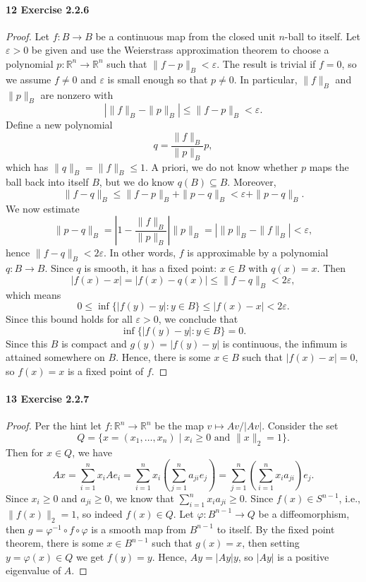 \documentclass[12pt]{article}
\newlength{\myparskip}
\newenvironment{fullbox}{\begin{lrbox}{\savefullbox}\begin{minipage}{\dimexpr\textwidth-2\fboxsep\relax}\setlength{\parskip}{\myparskip}}{\end{minipage}\end{lrbox}\framebox[\textwidth]{\usebox{\savefullbox}}}
\newenvironment{pbox}[1][]{\begin{fullbox}\def\temp{#1}\ifx\temp\empty\else\paragraph{#1}\phantom{}\fi}{\end{fullbox}}
\theoremstyle{definition}
\newcommand{\R}{\mathbb{R}}
\newcommand{\eps}{\varepsilon}
\renewcommand{\phi}{\varphi}
\newcommand{\<}{\langle}
\renewcommand{\>}{\rangle}
\newcommand{\seq}{\subseteq}
\begin{document}
\begin{pbox}[12 Exercise 2.2.6]
\end{pbox}

\begin{proof}
    Let $f : B \to B$ be a continuous map from the closed unit $n$-ball to itself.
    Let $\eps > 0$ be given and use the Weierstrass approximation theorem to choose a polynomial $p : \R^n \to \R^n$ such that $\|f - p\|_{B} < \eps$.
    The result is trivial if $f = 0$, so we assume $f \ne 0$ and $\eps$ is small enough so that $p \ne 0$.
    In particular, $\|f\|_B$ and $\|p\|_B$ are nonzero with
    \[
        |\|f\|_{B} - \|p\|_{B}| \leq \|f - p\|_{B} < \eps.
    \]
    Define a new polynomial
    \[
        q = \frac{\|f\|_{B}}{\|p\|_{B}}p,
    \]
    which has $\|q\|_B = \|f\|_B \leq 1$.
    A priori, we do not know whether $p$ maps the ball back into itself $B$, but we do know $q(B) \seq B$.
    Moreover,
    \[
        \|f - q\|_B
            \leq \|f - p\|_B + \|p - q\|_B
            < \eps + \|p - q\|_B.
    \]
    We now estimate
    \[
        \|p - q\|_B
            = \left|1 - \frac{\|f\|_B}{\|p\|_B}\right|\|p\|_B
            = |\|p\|_B - \|f\|_B|
            < \eps,
    \]
    hence $\|f - q\|_B < 2\eps$.
    In other words, $f$ is approximable by a polynomial $q : B \to B$.
    Since $q$ is smooth, it has a fixed point: $x \in B$ with $q(x) = x$.
    Then
    \[
        |f(x) - x|
            = |f(x) - q(x)|
            \leq \|f - q\|_B
            < 2\eps,
    \]
    which means
    \[
        0 \leq \inf\{|f(y) - y| : y \in B\} \leq |f(x) - x| < 2\eps.
    \]
    Since this bound holds for all $\eps > 0$, we conclude that
    \[
        \inf\{|f(y) - y| : y \in B\} = 0.
    \]
    Since this $B$ is compact and $g(y) = |f(y) - y|$ is continuous, the infimum is attained somewhere on $B$.
    Hence, there is some $x \in B$ such that $|f(x) - x| = 0$, so $f(x) = x$ is a fixed point of $f$.
\end{proof}


\newpage
\begin{pbox}[13 Exercise 2.2.7]
\end{pbox}

\begin{proof}
    Per the hint let $f : \R^n \to \R^n$ be the map $v \mapsto Av/|Av|$.
    Consider the set
    \[\textstyle
        Q = \{x = (x_1, \dots, x_n) \mid x_i \geq 0 \text{ and }\|x\|_2 = 1\}.
    \]
    Then for $x \in Q$, we have
    \[
        Ax
            = \sum_{i=1}^{n} x_iAe_i
            = \sum_{i=1}^{n} x_i\left(\sum_{j=1}^{n} a_{ji}e_j\right)
            = \sum_{j=1}^{n}\left(\sum_{i=1}^{n} x_ia_{ji}\right)e_j.
    \]
    Since $x_i \geq 0$ and $a_{ji} \geq 0$, we know that $\sum_{i=1}^{n} x_i a_{ji} \geq 0$.
    Since $f(x) \in S^{n-1}$, i.e., $\|f(x)\|_2 = 1$, so indeed $f(x) \in Q$.
    Let $\phi : B^{n-1} \to Q$ be a diffeomorphism, then $g = \phi^{-1} \circ f \circ \phi$ is a smooth map from $B^{n-1}$ to itself.
    By the fixed point theorem, there is some $x \in B^{n-1}$ such that $g(x) = x$, then setting $y = \phi(x) \in Q$ we get $f(y) = y$.
    Hence, $Ay = |Ay|y$, so $|Ay|$ is a positive eigenvalue of $A$.
\end{proof}
\end{document}
